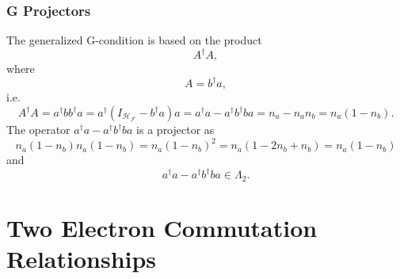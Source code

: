 \documentclass[aps,preprint,amsfonts,amssymb,showpacs,showkeys]{revtex4}%
\begin{document}
\subsubsection{G Projectors}

The generalized G-condition is based on the product
\begin{equation}
A^{\dagger}A,
\end{equation}
where
\begin{equation}
A=b^{\dagger}a,
\end{equation}
i.e.%
\begin{equation}
A^{\dagger}A=a^{\dagger}bb^{\dagger}a=a^{\dagger}\left(  I_{\mathcal{H}%
_{\mathcal{F}}}-b^{\dagger}a\right)  a=a^{\dagger}a-a^{\dagger}b^{\dagger
}ba=n_{a}-n_{a}n_{b}=n_{a}\left(  1-n_{b}\right)  .
\end{equation}
The operator $a^{\dagger}a-a^{\dagger}b^{\dagger}ba$ is a projector as
\begin{equation}
n_{a}\left(  1-n_{b}\right)  n_{a}\left(  1-n_{b}\right)  =n_{a}\left(
1-n_{b}\right)  ^{2}=n_{a}\left(  1-2n_{b}+n_{b}\right)  =n_{a}\left(
1-n_{b}\right)
\end{equation}
and
\begin{equation}
a^{\dagger}a-a^{\dagger}b^{\dagger}ba\in\Lambda_{2}.
\end{equation}


\section{Two Electron Commutation Relationships
\label{Commutation Relationship}}
\end{document}
